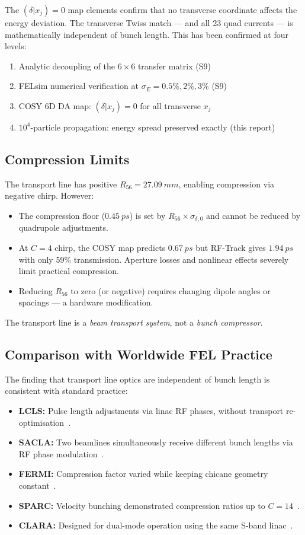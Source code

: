 \documentclass[11pt]{article}
\begin{document}
The $(\delta|x_j) = 0$ map elements confirm that no transverse
coordinate affects the energy deviation.  The transverse Twiss match
--- and all 23 quad currents --- is mathematically independent of
bunch length.  This has been confirmed at four levels:
\begin{enumerate}
  \item Analytic decoupling of the $6\times6$ transfer matrix (S9)
  \item FELsim numerical verification at $\sigma_E = 0.5\%, 2\%, 3\%$ (S9)
  \item COSY 6D DA map: $(\delta|x_j) = 0$ for all transverse $x_j$
  \item $10^4$-particle propagation: energy spread preserved exactly (this report)
\end{enumerate}

\subsection{Compression Limits}

The transport line has positive $R_{56} = \SI{27.09}{mm}$, enabling
compression via negative chirp.  However:
\begin{itemize}
  \item The compression floor ($\SI{0.45}{ps}$) is set by
    $R_{56} \times \sigma_{\delta,0}$ and cannot be reduced by
    quadrupole adjustments.
  \item At $C = 4$ chirp, the COSY map predicts $\SI{0.67}{ps}$
    but RF-Track gives $\SI{1.94}{ps}$ with only 59\% transmission.
    Aperture losses and nonlinear effects severely limit practical
    compression.
  \item Reducing $R_{56}$ to zero (or negative) requires changing
    dipole angles or spacings --- a hardware modification.
\end{itemize}

The transport line is a \emph{beam transport system}, not a \emph{bunch
compressor}.

\subsection{Comparison with Worldwide FEL Practice}

The finding that transport line optics are independent of bunch length
is consistent with standard practice:
\begin{itemize}
  \item \textbf{LCLS:} Pulse length adjustments via linac RF phases,
    without transport re-optimisation~\cite{lcls-faq}.
  \item \textbf{SACLA:} Two beamlines simultaneously receive different
    bunch lengths via RF phase modulation~\cite{Tono2019}.
  \item \textbf{FERMI:} Compression factor varied while keeping chicane
    geometry constant~\cite{DiMitri2012}.
  \item \textbf{SPARC:} Velocity bunching demonstrated compression
    ratios up to $C = 14$~\cite{Ferrario2010}.
  \item \textbf{CLARA:} Designed for dual-mode operation using the same
    S-band linac~\cite{Snedden2024}.
\end{itemize}
\end{document}
